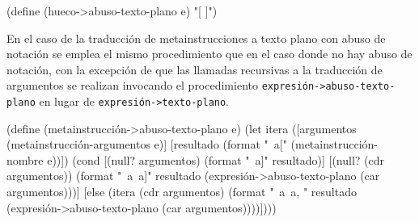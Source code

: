 \documentclass[letterpaper,twoside,openright,11pt]{book}
\begin{document}
\nwenddocs{}\plusendmoddef
(define (hueco->abuso-texto-plano e)
  "[ ]")

\eatline
{}\nwendcode{}\nwdocspar

En el caso de la traducción de metainstrucciones a texto plano con abuso de notación se emplea el mismo procedimiento que en el caso donde no hay abuso de notación, con la excepción de que las llamadas recursivas a la traducción de argumentos se realizan invocando el procedimiento {\tt{}\protect{}expresión->abuso-texto-plano} en lugar de {\tt{}\protect{}expresión->texto-plano}.

\nwenddocs{}\plusendmoddef
(define (metainstrucción->abuso-texto-plano e)
  (let itera ([argumentos (metainstrucción-argumentos e)]
              [resultado (format "~a[" (metainstrucción-nombre e))])
    (cond [(null? argumentos)
           (format "~a]" resultado)]
          [(null? (cdr argumentos))
           (format "~a~a]"
                   resultado
                   (expresión->abuso-texto-plano (car argumentos)))]
          [else
           (itera (cdr argumentos)
                  (format "~a~a, "
                          resultado
                          (expresión->abuso-texto-plano (car argumentos))))])))

\eatline
{}\nwendcode{}\nwdocspar
\end{document}

